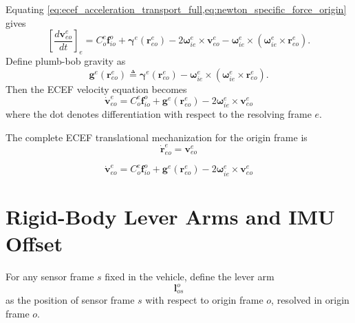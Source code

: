 \documentclass[11pt,oneside]{book}
\begin{document}
Equating \cref{eq:ecef_acceleration_transport_full,eq:newton_specific_force_origin} gives
\begin{equation}
\left[
\frac{d\mathbf{v}_{eo}^{e}}{dt}
\right]_e
=
C_o^e\mathbf{f}_{io}^{o}
+
\boldsymbol{\gamma}^{e}\left(\mathbf{r}_{eo}^{e}\right)
-
2\boldsymbol{\omega}_{ie}^{e}\times\mathbf{v}_{eo}^{e}
-
\boldsymbol{\omega}_{ie}^{e}\times
\left(
\boldsymbol{\omega}_{ie}^{e}\times
\mathbf{r}_{eo}^{e}
\right).
\label{eq:ecef_velocity_mass_attraction_origin}
\end{equation}
Define plumb-bob gravity as
\begin{equation}
\mathbf{g}^{e}\left(\mathbf{r}_{eo}^{e}\right)
\triangleq
\boldsymbol{\gamma}^{e}\left(\mathbf{r}_{eo}^{e}\right)
-
\boldsymbol{\omega}_{ie}^{e}\times
\left(
\boldsymbol{\omega}_{ie}^{e}\times
\mathbf{r}_{eo}^{e}
\right).
\label{eq:plumb_bob_gravity_origin}
\end{equation}
Then the ECEF velocity equation becomes
\begin{equation}
\boxed{
\dot{\mathbf{v}}_{eo}^{e}
=
C_o^e\mathbf{f}_{io}^{o}
+
\mathbf{g}^{e}\left(\mathbf{r}_{eo}^{e}\right)
-
2\boldsymbol{\omega}_{ie}^{e}\times\mathbf{v}_{eo}^{e}
}
\label{eq:ecef_velocity_plumb_bob_origin}
\end{equation}
where the dot denotes differentiation with respect to the resolving frame $e$.

The complete ECEF translational mechanization for the origin frame is
\begin{equation}
\boxed{
\dot{\mathbf{r}}_{eo}^{e}
=
\mathbf{v}_{eo}^{e}
}
\end{equation}

\begin{equation}
\boxed{
\dot{\mathbf{v}}_{eo}^{e}
=
C_o^e\mathbf{f}_{io}^{o}
+
\mathbf{g}^{e}\!\left(\mathbf{r}_{eo}^{e}\right)
-
2\boldsymbol{\omega}_{ie}^{e}
\times
\mathbf{v}_{eo}^{e}
}
\end{equation}

\section{Rigid-Body Lever Arms and IMU Offset}

For any sensor frame $s$ fixed in the vehicle, define the lever arm
\begin{equation}
\mathbf{l}_{os}^{o}
\end{equation}
as the position of sensor frame $s$ with respect to origin frame $o$, resolved in origin frame $o$.
\end{document}
